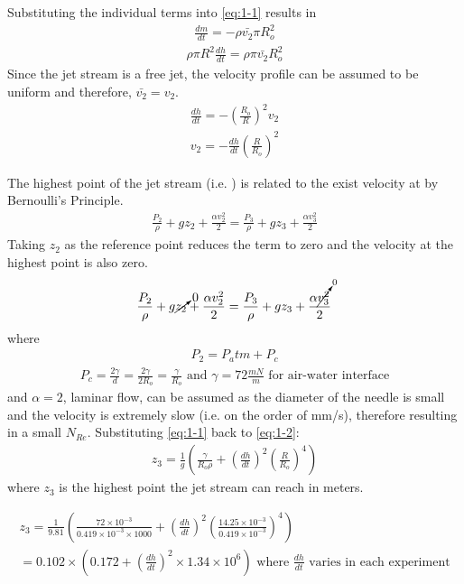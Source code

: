 \documentclass{article}
\newcommand*\circled[1]{\tikz[baseline=(char.base)]{
            \node[shape=circle,draw,inner sep=2pt] (char) {#1};}}
\begin{document}
Substituting the individual terms into \eqref{eq:1-1} results in
\begin{align*}
\frac{dm}{dt} = - \rho \bar{v_2} \pi R_o^2
\end{align*}
\begin{align*}
\rho \pi R^2 \frac{dh}{dt} = \rho \pi \bar{v_2} R_o^2
\end{align*}
Since the jet stream is a free jet, the velocity profile can be assumed to be uniform and therefore, $\bar{v_2} = v_2$.
\begin{align*}
\frac{dh}{dt} = -(\frac{R_o}{R})^2 v_2
\end{align*}
\begin{align}
v_2 = -\frac{dh}{dt} (\frac{R}{R_o})^2
\end{align}

The highest point of the jet stream (i.e. \circled{3}) is related to the exist velocity at \circled{2} by Bernoulli's Principle.
\begin{align*}
\frac{P_2}{\rho} + g z_2 + \frac{\alpha v_2^2}{2} = \frac{P_3}{\rho} + g z_3 + \frac{\alpha v_3^2}{2} 
\end{align*}
Taking $z_2$ as the reference point reduces the term to zero and the velocity at the highest point is also zero.
\begin{align}
\frac{P_2}{\rho} + g \cancelto{0}{z_2} + \frac{\alpha v_2^2}{2} = \frac{P_3}{\rho} + g z_3 + \frac{\alpha \cancelto{0}{v_3^2}}{2} \label{eq:1-2}  
\end{align}
where
\begin{align*}
P_2 = P_atm + P_c
\end{align*}
\begin{align*}
P_c = \frac{2\gamma}{d} = \frac{2\gamma}{2 R_o} = \frac{\gamma}{R_o}  \textrm{ and } \gamma = 72 \frac{mN}{m}  \textrm{ for air-water interface}
\end{align*}
and $\alpha = 2$, laminar flow, can be assumed as the diameter of the needle is small and the velocity is extremely slow (i.e. on the order of mm/s), therefore resulting in a small $N_{Re}$. Substituting \eqref{eq:1-1} back to \eqref{eq:1-2}:
\begin{align}
z_3 = \frac{1}{g} (\frac{\gamma}{R_o \rho} + (\frac{dh}{dt})^2(\frac{R}{R_o})^4)  \label{eq:1-3}  
\end{align}
where $z_3$ is the highest point the jet stream can reach in meters.

\begin{multline*}
z_3 = \frac{1}{9.81} (\frac{72\times10^{-3}}{0.419\times10^{-3} \times 1000} + (\frac{dh}{dt})^2(\frac{14.25\times10^{-3}}{0.419\times10^{-3}})^4)\\= 0.102\times(0.172 + (\frac{dh}{dt})^2 \times1.34\times{10^6}) \textrm{ where $\frac{dh}{dt}$ varies in each experiment}
\end{multline*}
\end{document}
